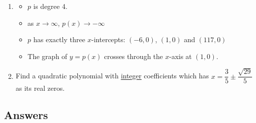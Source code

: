 \begin{enumerate}
\item \label{buildapolyexerlast}

\begin{itemize}

\item $p$ is degree 4.
\item as $x \rightarrow \infty$, $p(x) \rightarrow -\infty$
\item $p$ has exactly three $x$-intercepts:  $(-6,0)$, $(1,0)$ and $(117,0)$
\item  The graph of $y=p(x)$ crosses through the $x$-axis at $(1,0)$.

\end{itemize}



\item Find a quadratic polynomial with \underline{integer} coefficients which has $x = \dfrac{3}{5} \pm \dfrac{\sqrt{29}}{5}$ as its real zeros.

\end{enumerate}

\newpage

\subsection{Answers}


